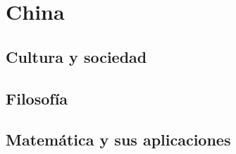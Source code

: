 \documentclass[a4paper,12pt,openany]{article}
\begin{document}
\section*{China}
\subsection*{Cultura y sociedad}


\subsection*{Filosofía}


\subsection*{Matemática y sus aplicaciones}

\end{document}
